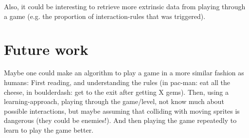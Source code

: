 \documentclass[a4paper,titlepage,final]{report}
\begin{document}
Also, it could be interesting to retrieve more extrinsic data from playing through a game (e.g. the proportion of interaction-rules that was triggered).


\section{Future work}

Maybe one could make an algorithm to play a game in a more similar fashion as humans:
First reading, and understanding the rules (in pac-man: eat all the cheese, in boulderdash: get to the exit after getting X gems).
Then, using a learning-approach, playing through the game/level, not know much about possible interactions, but maybe assuming that colliding with moving sprites is dangerous (they could be enemies!).
And then playing the game repeatedly to learn to play the game better.





\end{document}
